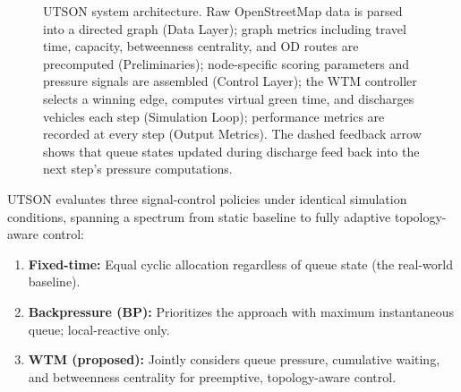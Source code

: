 \documentclass[letterpaper, conference]{IEEEtran}
\begin{document}
\begin{figure}[t]
\caption{UTSON system architecture. Raw OpenStreetMap data is parsed into a directed graph (Data Layer); graph metrics including travel time, capacity, betweenness centrality, and OD routes are precomputed (Preliminaries); node-specific scoring parameters and pressure signals are assembled (Control Layer); the WTM controller selects a winning edge, computes virtual green time, and discharges vehicles each step (Simulation Loop); performance metrics are recorded at every step (Output Metrics). The dashed feedback arrow shows that queue states updated during discharge feed back into the next step's pressure computations.}
\label{fig:utson_block}
\end{figure}

UTSON evaluates three signal-control policies under identical simulation conditions, spanning a spectrum from static baseline to fully adaptive topology-aware control:
\begin{enumerate}[leftmargin=*]
\item \textbf{Fixed-time:} Equal cyclic allocation regardless of queue state (the real-world baseline).
\item \textbf{Backpressure (BP):} Prioritizes the approach with maximum instantaneous queue; local-reactive only.
\item \textbf{WTM (proposed):} Jointly considers queue pressure, cumulative waiting, and betweenness centrality for preemptive, topology-aware control.
\end{enumerate}
\end{document}
